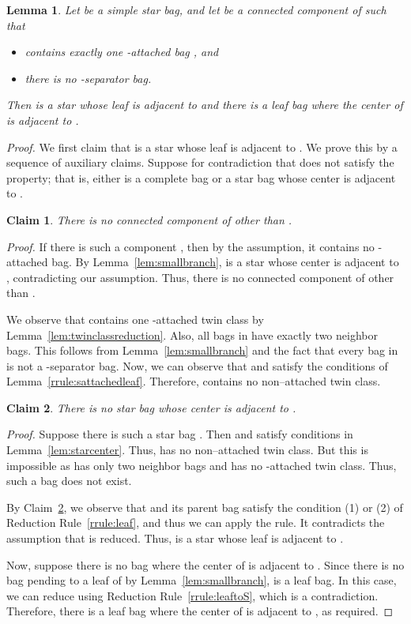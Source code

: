 \documentclass[11pt]{elsarticle}
\newtheorem{lemma}[theorem]{Lemma}
\newtheorem{claim}{Claim}
\newenvironment{clproof}{\begin{list}{}{\setlength{\leftmargin}{5mm}} \item {\it Proof.} }{\hfill\end{list}\medskip}
\begin{document}
\begin{lemma}
\label{lem:simplifynearsattached}
Let  be a simple star bag, and let  be a  connected component of  such that
\begin{itemize}
\item  contains exactly one -attached bag , and
\item there is no -separator bag.
\end{itemize}
Then  is a star whose leaf is adjacent to  and there is a leaf bag  where the center of  is adjacent to .
\end{lemma}
\begin{proof}
We first claim that  is a star whose leaf is adjacent to . We prove this by a sequence of auxiliary claims.
Suppose for contradiction that  does not satisfy the property; that is, either  is a complete bag or a star bag whose center is adjacent to .

\begin{claim}
There is no connected component of  other than .
\end{claim}
\begin{clproof}
If there is such a component , then by the assumption, it contains no -attached bag.
By Lemma~\ref{lem:smallbranch},  is a star whose center is adjacent to , 
contradicting our assumption. Thus, there is no connected component of  other than . 
\end{clproof}

We observe that  contains one -attached twin class by Lemma~\ref{lem:twinclassreduction}.
Also, all bags in  have exactly two neighbor bags.
This follows from Lemma~\ref{lem:smallbranch} and the fact that every bag in  is not a -separator bag. 
Now, we can observe that  and  satisfy the conditions of Lemma~\ref{rrule:sattachedleaf}.
Therefore,  contains no non--attached twin class.

\begin{claim}\label{claim:starreverse}
There is no star bag  whose center is adjacent to .
\end{claim}
\begin{clproof}
Suppose there is such a star bag .
Then  and  satisfy conditions in Lemma~\ref{lem:starcenter}.
Thus,  has no non--attached twin class.
But this is impossible as  has only two neighbor bags and  has no -attached twin class.
Thus, such a bag  does not exist.
\end{clproof}

By Claim~\ref{claim:starreverse}, we observe that  and its parent bag satisfy the condition (1) or (2) of Reduction Rule~\ref{rrule:leaf}, and thus we can apply the rule.
It contradicts the assumption that  is reduced.
Thus,  is a star whose leaf is adjacent to .

Now, suppose there is no bag  where the center of  is adjacent to .
Since there is no bag pending to a leaf of  by Lemma~\ref{lem:smallbranch},
 is a leaf bag. In this case, we can reduce using Reduction Rule~\ref{rrule:leaftoS}, which is a contradiction.
Therefore, there is a leaf bag  where the center of  is adjacent to , as required.
\end{proof}
\end{document}
